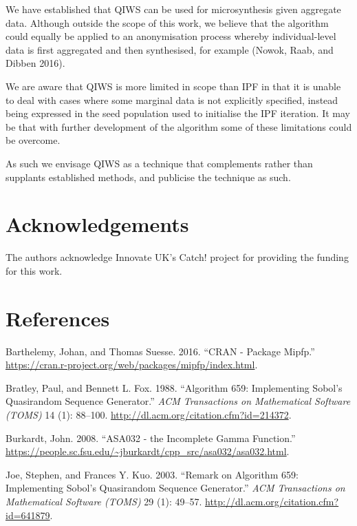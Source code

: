 \documentclass[]{article}
\begin{document}
We have established that QIWS can be used for microsynthesis given
aggregate data. Although outside the scope of this work, we believe that
the algorithm could equally be applied to an anonymisation process
whereby individual-level data is first aggregated and then synthesised,
for example (Nowok, Raab, and Dibben 2016).

We are aware that QIWS is more limited in scope than IPF in that it is
unable to deal with cases where some marginal data is not explicitly
specified, instead being expressed in the seed population used to
initialise the IPF iteration. It may be that with further development of
the algorithm some of these limitations could be overcome.

As such we envisage QIWS as a technique that complements rather than
supplants established methods, and publicise the technique as such.

\section{Acknowledgements}\label{acknowledgements}

The authors acknowledge Innovate UK's Catch! project for providing the
funding for this work.

\section*{References}\label{references}

\hypertarget{refs}{}
\hypertarget{ref-barthelemy_cran_2016}{}
Barthelemy, Johan, and Thomas Suesse. 2016. ``CRAN - Package Mipfp.''
\url{https://cran.r-project.org/web/packages/mipfp/index.html}.

\hypertarget{ref-bratley_algorithm_1988}{}
Bratley, Paul, and Bennett L. Fox. 1988. ``Algorithm 659: Implementing
Sobol's Quasirandom Sequence Generator.'' \emph{ACM Transactions on
Mathematical Software (TOMS)} 14 (1): 88--100.
\url{http://dl.acm.org/citation.cfm?id=214372}.

\hypertarget{ref-burkardt_asa032_2008}{}
Burkardt, John. 2008. ``ASA032 - the Incomplete Gamma Function.''
\url{https://people.sc.fsu.edu/~jburkardt/cpp_src/asa032/asa032.html}.

\hypertarget{ref-joe_remark_2003}{}
Joe, Stephen, and Frances Y. Kuo. 2003. ``Remark on Algorithm 659:
Implementing Sobol's Quasirandom Sequence Generator.'' \emph{ACM
Transactions on Mathematical Software (TOMS)} 29 (1): 49--57.
\url{http://dl.acm.org/citation.cfm?id=641879}.
\end{document}
